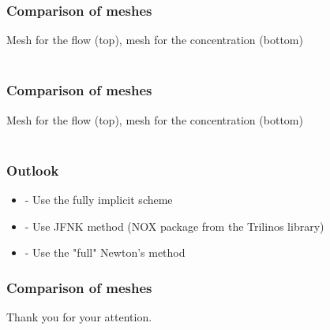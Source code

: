 \documentclass{beamer}
\begin{document}
\begin{frame}
\frametitle{Comparison of meshes}
\begin{center}
Mesh for the flow (top), mesh for the concentration (bottom)\\ 
\\
\end{center}
\end{frame}

\begin{frame}
\frametitle{Comparison of meshes}
\begin{center}
Mesh for the flow (top), mesh for the concentration (bottom)\\ 
\\
\end{center}
\end{frame}

\begin{frame}
\frametitle{Outlook}
\begin{center}
\begin{itemize}
\item - Use the fully implicit scheme
\item - Use JFNK method (NOX package from the Trilinos library)
\item - Use the "full" Newton's method
\end{itemize}
\end{center}
\end{frame}


\begin{frame}
\frametitle{Comparison of meshes}
\begin{center}
\Large
Thank you for your attention.
\end{center}
\end{frame}
\end{document}
